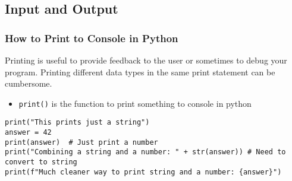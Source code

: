 \documentclass[10pt, a4paper]{beamer} %
\begin{document}
\subsection{Input and Output} %
\label{sub:input_output}

\begin{frame}[c, fragile]\frametitle{How to Print to Console in Python}
	Printing is useful to provide feedback to the user or sometimes to debug your program. Printing different data types
	in the same print statement can be cumbersome.
	\begin{itemize}
		\item \texttt{print()} is the function to print something to console in python
	\end{itemize}

	\begin{lstlisting}
print("This prints just a string")
answer = 42
print(answer)  # Just print a number
print("Combining a string and a number: " + str(answer)) # Need to convert to string
print(f"Much cleaner way to print string and a number: {answer}")
\end{lstlisting}
\end{frame}
\end{document}
